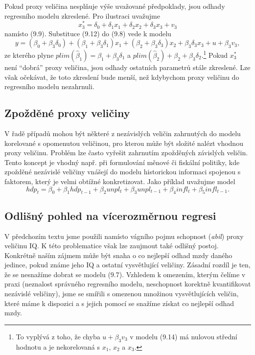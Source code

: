 Pokud proxy veličina nesplňuje výše uvažované předpoklady, jsou odhady regresního modelu zkreslené. Pro ilustraci uvažujme
\begin{equation}
x_3^* = \delta_0 + \delta_1 x_1 + \delta_2 x_2 + \delta_3 x_3 + v_3
\end{equation}
namísto (9.9). Substituce (9.12) do (9.8) vede k modelu
\begin{equation}
y = (\beta_0 + \beta_3 \delta_0) + (\beta_1 + \beta_3 \delta_1) x_1 + (\beta_2 + \beta_3 \delta_3) x_2 + \beta_3 \delta_3 x_3 + u + \beta_3 v_3,
\end{equation}
ze kterého plyne $plim(\hat{\beta}_1) = \beta_1 + \beta_3 \delta_1$ a $plim(\hat{\beta}_2) + \beta_2 + \beta_3 \delta_2$.\footnote{To vyplývá z toho, že chyba $u + \beta_3 v_3$ v modelu (9.14) má nulovou střední hodnotu a je nekorelovaná s $x_1$, $x_2$ a $x_3$.} Pokud $x_3^*$ není ``dobrá'' proxy veličina, jsou odhady ostatních parametrů stále zkreslené. Lze však očekávat, že toto zkreslení bude menší, než kdybychom proxy veličinu do regresního modelu nezahrnuli.

\subsection{Zpožděné proxy veličiny}

V řadě případů mohou být některé z nezávislých veličin zahrnutých do modelu korelované s opomenutou veličinou, pro kterou může být složité nalézt vhodnou proxy veličinu. Problém lze často vyřešit zahrnutím zpožděných závislých veličin. Tento koncept je vhodný např. při formulování měnové či fiskální politiky, kde zpožděné nezávislé veličiny vnášejí do modelu historickou informaci spojenou s faktorem, který je velmi obtížné konkretizovat. Jako příklad uvažujme model
\begin{equation}
hdp_t = \beta_0 + \beta_1 hdp_{t - 1} + \beta_2 unpl_t + \beta_3 unpl_{t - 1} + \beta_4 infl_t + \beta_5 infl_{t - 1}.
\end{equation}

\subsection{Odlišný pohled na vícerozměrnou regresi}

V předchozím textu jsme použili namísto vágního pojmu schopnost (\textit{abil}) proxy veličinu IQ. K této problematice však lze zaujmout také odlišný postoj. Konkrétně naším zájmem může být snaha o co nejlepší odhad mzdy daného jedince, pokud známe jeho IQ a ostatní vysvětlující veličiny. Zásadní rozdíl je ten, že se nesnažíme dobrat se modelu (9.7). Vzhledem k omezením, kterým čelíme v praxi (neznalost správného regresního modelu, neschopnost korektně kvantifikovat nezávislé veličiny), jsme se smířili s omezenou množinou vysvětlujících veličin, které máme k dispozici a s jejich pomocí se snažíme získat co nejlepší odhad mzdy.

